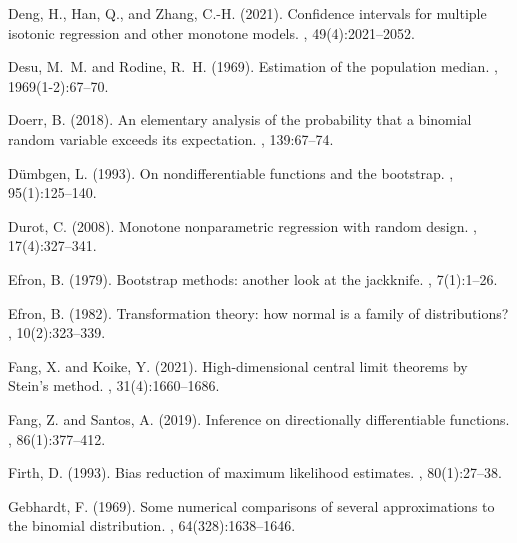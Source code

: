 \documentclass{article}
\numberwithin{myalgctr}{section}
\begin{document}
\begin{thebibliography}{}
Deng, H., Han, Q., and Zhang, C.-H. (2021).
\newblock Confidence intervals for multiple isotonic regression and other
  monotone models.
, 49(4):2021--2052.

Desu, M.~M. and Rodine, R.~H. (1969).
\newblock Estimation of the population median.
, 1969(1-2):67--70.

Doerr, B. (2018).
\newblock An elementary analysis of the probability that a binomial random
  variable exceeds its expectation.
, 139:67--74.

D\"{u}mbgen, L. (1993).
\newblock On nondifferentiable functions and the bootstrap.
, 95(1):125--140.

Durot, C. (2008).
\newblock Monotone nonparametric regression with random design.
, 17(4):327--341.

Efron, B. (1979).
\newblock Bootstrap methods: another look at the jackknife.
, 7(1):1--26.

Efron, B. (1982).
\newblock Transformation theory: how normal is a family of distributions?
, 10(2):323--339.

Fang, X. and Koike, Y. (2021).
\newblock High-dimensional central limit theorems by {S}tein's method.
, 31(4):1660--1686.

Fang, Z. and Santos, A. (2019).
\newblock Inference on directionally differentiable functions.
, 86(1):377--412.

Firth, D. (1993).
\newblock Bias reduction of maximum likelihood estimates.
, 80(1):27--38.

Gebhardt, F. (1969).
\newblock Some numerical comparisons of several approximations to the binomial
  distribution.
, 64(328):1638--1646.


\end{thebibliography}
\end{document}

